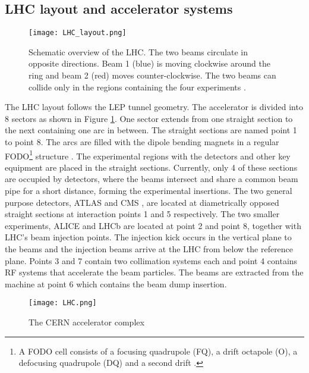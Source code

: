 \subsection{\label{sec:exp_LHC_1}LHC layout and accelerator systems}
\begin{figure}[H]
    \centering
    \texttt{[image: LHC\_layout.png]}
    \caption{Schematic overview of the LHC. The two beams circulate in opposite directions. Beam 1 (blue) is moving clockwise around the ring and beam 2 (red) moves counter-clockwise. The two beams can collide only in the regions containing the four experiments \cite{NorderhaugDrosdal:2015gkl}.}
    \label{fig:LHC_layout}
\end{figure}
\noindent The LHC layout follows the LEP tunnel geometry. The accelerator is divided into 8 sectors as shown in Figure \ref{fig:LHC_layout}. One sector extends from one straight section to the next containing one arc in between. The straight sections are named point 1 to point 8. The arcs are filled with the dipole bending magnets in a regular FODO\footnote{A FODO cell consists of a focusing quadrupole (FQ), a drift octapole (O), a defocusing quadrupole (DQ) and a second drift \cite{FODO}.} structure \cite{NorderhaugDrosdal:2015gkl}. The experimental regions with the detectors and other key equipment are placed in the straight sections. Currently, only 4 of these sections are occupied by detectors, where the beams intersect and share a common beam pipe for a short distance, forming the experimental insertions. The two general purpose detectors, ATLAS \cite{ATLAS:2008xda} and CMS \cite{CMS:2008xjf}, are located at diametrically opposed straight sections at interaction points 1 and 5 respectively. The two smaller experiments, ALICE \cite{ALICE:2008ngc} and LHCb \cite{LHCb:2008vvz} are located at point 2 and point 8, together with LHC’s beam injection points. The injection kick occurs in the vertical plane to the beams and the injection beams arrive at the LHC from below the reference plane. Points 3 and 7 contain two collimation systems each and point 4 contains RF systems that accelerate the beam particles. The beams are extracted from the machine at point 6 which contains the beam dump insertion. \\
\begin{figure}[H]
    \centering
    \texttt{[image: LHC.png]}
    \caption{The CERN accelerator complex \cite{Lopienska:2800984}}
    \label{fig:CERN accelarators}
\end{figure}
